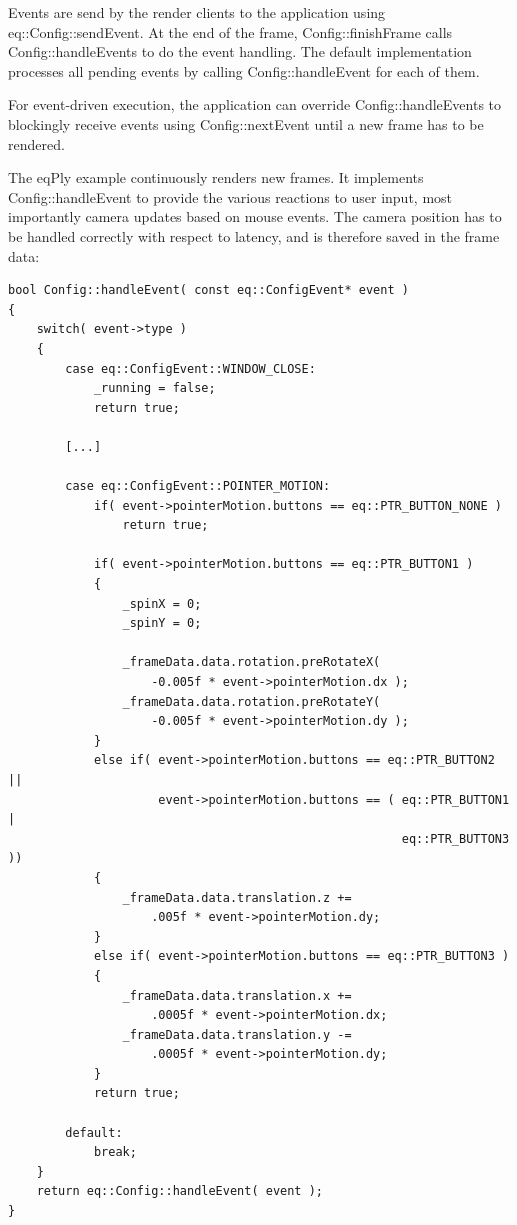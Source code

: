 \documentclass[10pt,a4]{scrartcl}
\begin{document}
Events are send by the render clients to the application using
\textsf{eq::Config::sendEvent}. At the end of the frame,
\textsf{Config::finishFrame} calls \textsf{Config::handleEvents} to do
the event handling. The default implementation processes all pending
events by calling \textsf{Config::handleEvent} for each of them.

For event-driven execution, the application can override
\textsf{Config::handleEvents} to blockingly receive events using
\textsf{Config::nextEvent} until a new frame has to be rendered.

The \textsf{eqPly} example continuously renders new frames. It
implements \textsf{Config::hand\-le\-Event} to provide the various reactions
to user input, most importantly camera updates based on mouse
events. The camera position has to be handled correctly with respect to
latency, and is therefore saved in the frame data:

{\footnotesize\begin{lstlisting}
bool Config::handleEvent( const eq::ConfigEvent* event )
{
    switch( event->type )
    {
        case eq::ConfigEvent::WINDOW_CLOSE:
            _running = false;
            return true;

        [...]

        case eq::ConfigEvent::POINTER_MOTION:
            if( event->pointerMotion.buttons == eq::PTR_BUTTON_NONE )
                return true;

            if( event->pointerMotion.buttons == eq::PTR_BUTTON1 )
            {
                _spinX = 0;
                _spinY = 0;

                _frameData.data.rotation.preRotateX( 
                    -0.005f * event->pointerMotion.dx );
                _frameData.data.rotation.preRotateY(
                    -0.005f * event->pointerMotion.dy );
            }
            else if( event->pointerMotion.buttons == eq::PTR_BUTTON2 ||
                     event->pointerMotion.buttons == ( eq::PTR_BUTTON1 |
                                                       eq::PTR_BUTTON3 ))
            {
                _frameData.data.translation.z +=
                    .005f * event->pointerMotion.dy;
            }
            else if( event->pointerMotion.buttons == eq::PTR_BUTTON3 )
            {
                _frameData.data.translation.x += 
                    .0005f * event->pointerMotion.dx;
                _frameData.data.translation.y -= 
                    .0005f * event->pointerMotion.dy;
            }
            return true;

        default:
            break;
    }
    return eq::Config::handleEvent( event );
}
\end{lstlisting}}
\end{document}
